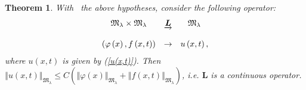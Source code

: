 \documentclass{amsart}\usepackage{amsfonts}
\newtheorem{theorem}{Theorem}[section]
\theoremstyle{plain}
\numberwithin{equation}{section}
\begin{document}
\begin{theorem}
\label{Thm3}With \ the above hypotheses, consider the following operator:\[\begin{array}
[c]{ccc}\mathfrak{M}_{\lambda}\times\mathfrak{M}_{\lambda} & \underrightarrow
{\boldsymbol{L}} & \mathfrak{M}_{\lambda}\\
&  & \\
\left(  \varphi\left(  x\right)  ,f\left(  x,t\right)  \right)  & \rightarrow
& u\left(  x,t\right)  ,
\end{array}
\]
where $u\left(  x,t\right)  $ is given by (\ref{u(x,t)}). Then $\left\Vert
u\left(  x,t\right)  \right\Vert _{\mathfrak{M}_{\lambda}}\leq C\left(
\left\Vert \varphi\left(  x\right)  \right\Vert _{\mathfrak{M}_{\lambda}}+\left\Vert f\left(  x,t\right)  \right\Vert _{\mathfrak{M}_{\lambda}}\right)  $, i.e. $\boldsymbol{L}$ is a continuous operator.
\end{theorem}
\end{document}
